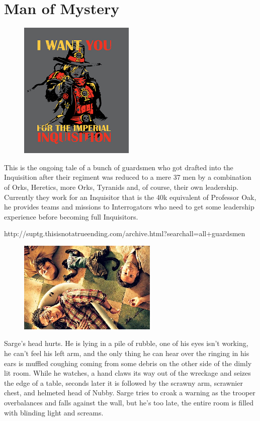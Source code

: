 \chapter{Man of Mystery}

\begin{figure}
	\begin{center}
		\includegraphics[width=\figwidth]{pics/9/1.png}
	\end{center}
\end{figure}
This is the ongoing tale of a bunch of guardsmen who got drafted into the Inquisition after their regiment was reduced to a mere 37 men by a combination of Orks, Heretics, more Orks, Tyranids and, of course, their own leadership. 
Currently they work for an Inquisitor that is the 40k equivalent of Professor Oak, he provides teams and missions to Interrogators who need to get some leadership experience before becoming full Inquisitors.


http://suptg.thisisnotatrueending.com/archive.html?searchall=all+guardsmen

\begin{figure}
	\begin{center}
		\includegraphics[width=\figwidth]{pics/9/2.png}
	\end{center}
\end{figure}
Sarge's head hurts. 
He is lying in a pile of rubble, one of his eyes isn't working, he can't feel his left arm, and the only thing he can hear over the ringing in his ears is muffled coughing coming from some debris on the other side of the dimly lit room. 
While he watches, a hand claws its way out of the wreckage and seizes the edge of a table, seconds later it is followed by the scrawny arm, scrawnier chest, and helmeted head of Nubby. 
Sarge tries to croak a warning as the trooper overbalances and falls against the wall, but he's too late, the entire room is filled with blinding light and screams.

